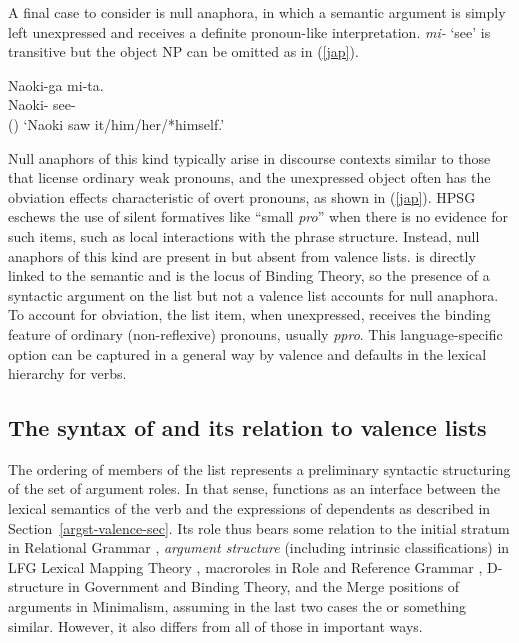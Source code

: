 \documentclass[output=paper
 	        ,biblatex
                ,babelshorthands
                ,newtxmath
                ,draftmode
                ,colorlinks, citecolor=brown
]{langscibook}
\begin{document}
A final case to consider is null anaphora, in which a semantic argument is simply left unexpressed
and receives a definite pronoun-like interpretation.   \textit{mi-} `see' is
transitive but the object NP can be omitted as in (\ref{jap}).

\ea
\label{jap}
\gll Naoki-ga       mi-ta.  \\
     Naoki- see-  \\\hfill()
\glt `Naoki saw it/him/her/*himself.'
\z

\noindent
Null anaphors of this kind typically arise in discourse contexts similar to those that license
ordinary weak pronouns, and the unexpressed object often has the obviation effects characteristic of
overt pronouns, as shown in (\ref{jap}).  HPSG eschews the use of silent formatives
like ``small \textit{pro}'' when there is no evidence for such items, such as local interactions with
the phrase structure.  Instead, null anaphors of this kind are present in \argst but absent from
valence lists.  \argst is directly linked to the semantic \content and is the locus of Binding Theory,
so the presence of a syntactic argument on the \argst list but not a valence list accounts for null
anaphora. To account for obviation, the \argst list item, when unexpressed, receives the
binding feature of ordinary (non-reflexive) pronouns, usually \textit{ppro}.  This language-specific
option can be captured in a general way by valence and \argst defaults in the lexical hierarchy for
verbs.

\subsection{The syntax of  \texorpdfstring{\argst}{ARG-ST} and its relation to  valence lists}
\label{argst-sec}


The ordering of members of the \argst list represents a preliminary syntactic structuring of the set
of argument roles.  In that sense, \argst functions as an interface between the lexical semantics of
the verb and the expressions of dependents as described in Section~\ref{argst-valence-sec}.  Its
role thus bears some relation to the initial stratum in Relational Grammar
\citep{PerlmutterandPostal1984}, \textit{argument structure} (including
intrinsic classifications) in LFG Lexical Mapping Theory
\citep{Bresnan+etal:2015}, macroroles in Role and Reference Grammar \citep{VanValinandLapolla1997},
D-structure in Government and Binding Theory, and the Merge positions of arguments in
Minimalism, assuming in the last two cases the 
\citep[46]{Baker1988} or something similar.  However, it also differs from all of those in important
ways.
\end{document}
